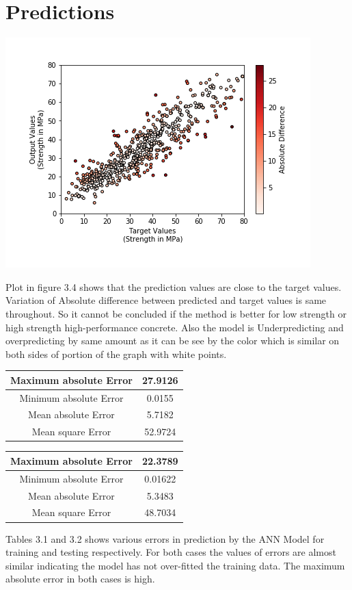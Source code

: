 \section{Predictions}
\begin{center}
	\includegraphics{images/comparison.png}
\end{center}
Plot in figure 3.4 shows that the prediction values are close to the target values. Variation of Absolute difference between predicted and target values is same throughout. So it cannot be concluded if the method is better for low strength or high strength high-performance concrete. Also the model is Underpredicting and overpredicting by same amount as it can be see by the color which is similar on both sides of portion of the graph with white points.
\begin{center}
	\begin{tabular}{|c|c|}
		\hline
		Maximum absolute Error & 27.9126\\
		\hline
		Minimum absolute Error & 0.0155\\
		\hline
		Mean absolute Error & 5.7182\\
		\hline
		Mean square Error & 52.9724\\
		\hline
	\end{tabular}
\end{center}
\begin{center}
	\begin{tabular}{|c|c|}
		\hline
		Maximum absolute Error & 22.3789\\
		\hline
		Minimum absolute Error & 0.01622\\
		\hline
		Mean absolute Error & 5.3483\\
		\hline
		Mean square Error & 48.7034\\
		\hline
	\end{tabular}
\end{center}
Tables 3.1 and 3.2 shows various errors in prediction by the ANN Model for training and testing respectively. For both cases the values of errors are almost similar indicating the model has not over-fitted the training data. The maximum absolute error in both cases is high.

